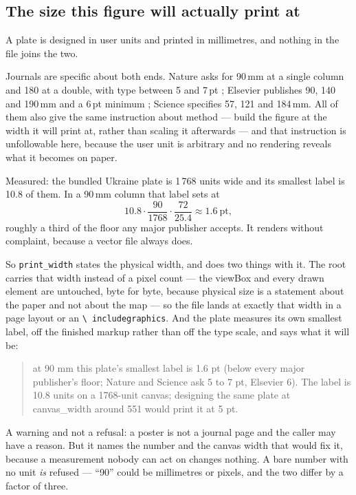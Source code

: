 \documentclass[11pt]{article}
\begin{document}
\subsection{The size this figure will actually print at}
\label{sec:print-size}

A plate is designed in user units and printed in millimetres, and nothing in
the file joins the two.

Journals are specific about both ends. Nature asks for 90\,mm at a single
column and 180 at a double, with type between 5 and 7\,pt
\parencite{nature-figures}; Elsevier publishes 90, 140 and 190\,mm and a 6\,pt
minimum \parencite{elsevier-artwork}; Science specifies 57, 121 and 184\,mm. All of
them also give the same instruction about method --- build the figure at the
width it will print at, rather than scaling it afterwards --- and that
instruction is unfollowable here, because the user unit is arbitrary and no
rendering reveals what it becomes on paper.

Measured: the bundled Ukraine plate is 1\,768 units wide and its smallest
label is 10.8 of them. In a 90\,mm column that label sets at
\[
10.8 \cdot \frac{90}{1768} \cdot \frac{72}{25.4} \approx 1.6\ \mathrm{pt},
\]
roughly a third of the floor any major publisher accepts. It renders without
complaint, because a vector file always does.

So \texttt{print\_width} states the physical width, and does two things with
it. The root carries that width instead of a pixel count --- the viewBox and
every drawn element are untouched, byte for byte, because physical size is a
statement about the paper and not about the map --- so the file lands at
exactly that width in a page layout or an \texttt{\textbackslash
includegraphics}. And the plate measures its own smallest label, off the
finished markup rather than off the type scale, and says what it will be:

\begin{quote}\small
at 90 mm this plate's smallest label is 1.6 pt (below every major publisher's
floor; Nature and Science ask 5 to 7 pt, Elsevier 6). The label is 10.8 units
on a 1768-unit canvas; designing the same plate at canvas\_width around 551
would print it at 5 pt.
\end{quote}

A warning and not a refusal: a poster is not a journal page and the caller may
have a reason. But it names the number and the canvas width that would fix it,
because a measurement nobody can act on changes nothing. A bare number with no
unit \emph{is} refused --- ``90'' could be millimetres or pixels, and the two
differ by a factor of three.
\end{document}
